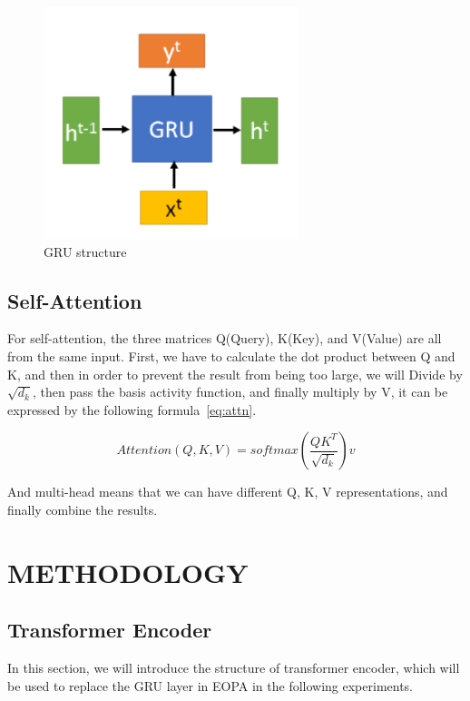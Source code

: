 \documentclass{article}
\begin{document}
\begin{figure}
    \centering
    \includegraphics[scale=0.5]{gru}
    \caption{GRU structure}
    \label{fig:gru}
\end{figure}

\subsection{Self-Attention}

For self-attention, the three matrices Q(Query), K(Key), and V(Value) are
all from the same input. First, we have to calculate the dot product
between Q and K, and then in order to prevent the result
from being too large, we will Divide by $\sqrt{d_k}$,
then pass the basis activity function, and finally multiply by V,
it can be expressed by the following formula~\ref{eq:attn}.

\begin{equation}
    \label{eq:attn}
    Attention(Q,K,V)=softmax(\frac{QK^{T}}{\sqrt{d_{k}}})v
\end{equation}

And multi-head means that we can have different Q, K, V representations,
and finally combine the results.


\section{METHODOLOGY}

\subsection{Transformer Encoder}

In this section, we will introduce the structure of transformer encoder,
which will be used to replace the GRU layer in EOPA
in the following experiments.
\end{document}

